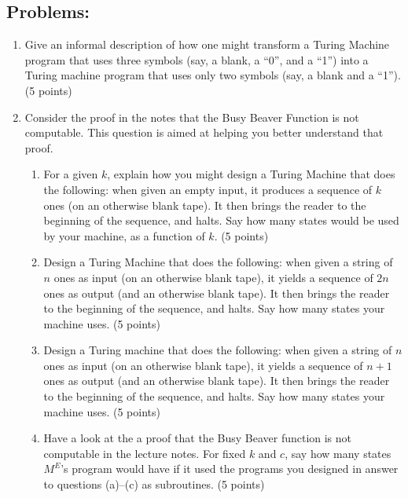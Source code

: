\documentclass[12pt,a4paper]{article}
\begin{document}
\subsection*{Problems:}

\begin{enumerate}

\item Give an informal description of how one might transform a Turing Machine program that uses three symbols (say, a blank, a ``0'', and a ``1'') into a Turing machine program that uses only two symbols (say, a blank and a ``1''). (5 points)

\item Consider the proof in the notes that the Busy Beaver Function is not computable. This question is aimed at helping you better understand that proof.
\begin{enumerate}

\item For a given $k$, explain how you might design a Turing Machine that does the following: when given an empty input, it produces a sequence of $k$ ones (on an otherwise blank tape). It then brings the reader to the beginning of the sequence, and halts. Say how many states would be used by your machine, as a function of $k$. (5 points)

\item Design a Turing Machine that does the following: when given a string of $n$ ones as input (on an otherwise blank tape), it yields a sequence of $2n$ ones as output (and an otherwise blank tape). It then brings the reader to the beginning of the sequence, and halts. Say how many states your machine uses. (5 points)

\item Design a Turing machine that does the following: when given a string of $n$ ones as input (on an otherwise blank tape), it yields a sequence of $n+1$ ones as output (and an otherwise blank tape). It then brings the reader to the beginning of the sequence, and halts. Say how many states your machine uses. (5 points)

\item Have a look at the a proof that the Busy Beaver function is not computable in the lecture notes. For fixed $k$ and $c$, say how many states $M^E$'s program would have if it used the programs you designed in answer to questions (a)--(c) as subroutines.  (5 points)

\end{enumerate}


\end{enumerate}
\end{document}
